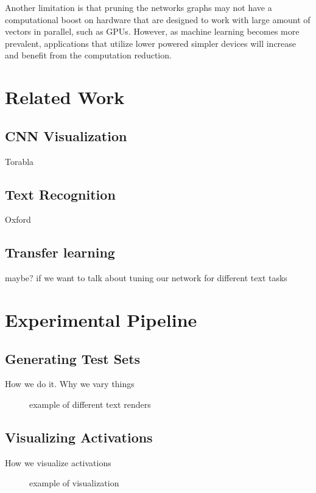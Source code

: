 \documentclass[10pt,twocolumn,letterpaper]{article}
\begin{document}
Another limitation is that pruning the networks graphs may not have a computational boost on hardware that are designed to work with large amount of vectors in parallel, such as GPUs. However, as machine learning becomes more prevalent, applications that utilize lower powered simpler devices will increase and benefit from the computation reduction.

\section{Related Work}


\subsection{CNN Visualization}

Torabla

\subsection{Text Recognition}

Oxford

\subsection{Transfer learning}

maybe? if we want to talk about tuning our network for different text tasks

\section{Experimental Pipeline}
\subsection{Generating Test Sets}
How we do it. Why we vary things

\begin{figure}
\caption{example of different text renders}
\label{fig:text}
\end{figure}

\subsection{Visualizing Activations}
How we visualize activations
\begin{figure}
\caption{example of visualization}
\label{fig:vis}
\end{figure}
\end{document}

